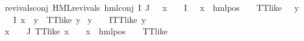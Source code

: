 \begin{isabellebody}
revivals{\isacharunderscore}{\kern0pt}conj{\isacharcolon}{\kern0pt}\ {\isachardoublequoteopen}HML{\isacharunderscore}{\kern0pt}revivals\ {\isacharparenleft}{\kern0pt}hml{\isacharunderscore}{\kern0pt}conj\ I\ J\ {\isasymPhi}{\isacharparenright}{\kern0pt}{\isachardoublequoteclose}\ \ {\isachardoublequoteopen}{\isacharparenleft}{\kern0pt}{\isasymexists}x\ {\isasymin}\ {\isacharparenleft}{\kern0pt}{\isasymPhi}\ {\isacharbackquote}{\kern0pt}\ I{\isacharparenright}{\kern0pt}{\isachardot}{\kern0pt}\ {\isacharparenleft}{\kern0pt}{\isasymexists}{\isasymalpha}\ {\isasymchi}{\isachardot}{\kern0pt}\ {\isacharparenleft}{\kern0pt}x\ {\isacharequal}{\kern0pt}\ hml{\isacharunderscore}{\kern0pt}pos\ {\isasymalpha}\ {\isasymchi}{\isacharparenright}{\kern0pt}\ {\isasymand}\ TT{\isacharunderscore}{\kern0pt}like\ {\isasymchi}{\isacharparenright}{\kern0pt}\ {\isasymand}\ {\isacharparenleft}{\kern0pt}{\isasymforall}y\ {\isasymin}\ {\isacharparenleft}{\kern0pt}{\isasymPhi}\ {\isacharbackquote}{\kern0pt}\ I{\isacharparenright}{\kern0pt}{\isachardot}{\kern0pt}\ x\ {\isasymnoteq}\ y\ {\isasymlongrightarrow}\ TT{\isacharunderscore}{\kern0pt}like\ y{\isacharparenright}{\kern0pt}{\isacharparenright}{\kern0pt}\isanewline
{\isasymor}\ {\isacharparenleft}{\kern0pt}{\isasymforall}y\ {\isasymin}\ {\isacharparenleft}{\kern0pt}{\isasymPhi}\ {\isacharbackquote}{\kern0pt}\ I{\isacharparenright}{\kern0pt}{\isachardot}{\kern0pt}TT{\isacharunderscore}{\kern0pt}like\ y{\isacharparenright}{\kern0pt}{\isachardoublequoteclose}\isanewline
{\isachardoublequoteopen}{\isacharparenleft}{\kern0pt}{\isasymforall}x\ {\isasymin}\ {\isacharparenleft}{\kern0pt}{\isasymPhi}\ {\isacharbackquote}{\kern0pt}\ J{\isacharparenright}{\kern0pt}{\isachardot}{\kern0pt}\ TT{\isacharunderscore}{\kern0pt}like\ x\ {\isasymor}\ {\isacharparenleft}{\kern0pt}{\isasymexists}{\isasymalpha}\ {\isasymchi}{\isachardot}{\kern0pt}\ {\isacharparenleft}{\kern0pt}x\ {\isacharequal}{\kern0pt}\ hml{\isacharunderscore}{\kern0pt}pos\ {\isasymalpha}\ {\isasymchi}{\isacharparenright}{\kern0pt}\ {\isasymand}\ TT{\isacharunderscore}{\kern0pt}like\ {\isasymchi}{\isacharparenright}{\kern0pt}{\isacharparenright}{\kern0pt}{\isachardoublequoteclose}\isanewline
%
\isadelimtheory
\isanewline
%
\endisadelimtheory
%
\isatagtheory
{}\isamarkupfalse%
%
\endisatagtheory
{\isafoldtheory}%
%
\isadelimtheory
%
\endisadelimtheory
%
\end{isabellebody}%
\endinput

